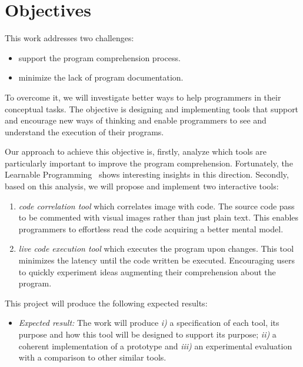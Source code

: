
% 
% 

\section{Objectives}

This work addresses two challenges:

\begin{itemize}
\item support the program comprehension process.
\item minimize the lack of program documentation.
\end{itemize}

To overcome it, we will investigate better ways to help programmers in their conceptual tasks. The objective is designing and implementing tools that support and encourage new ways of thinking and enable programmers to see and understand the execution of their programs.

Our approach to achieve this objective is, firstly, analyze which tools are particularly important to improve the program comprehension. Fortunately, the Learnable Programming~\cite{learnableProg,inventingPrin} shows interesting insights in this direction. Secondly, based on this analysis, we will propose and implement two interactive tools: 

\begin{enumerate}
\item \textit{code correlation tool} which correlates image with code. The source code pass to be commented with visual images rather than just plain text. This enables programmers to effortless read the code acquiring a better mental model.
\item \textit{live code execution tool} which executes the program upon changes. This tool minimizes the latency until the code written be executed. Encouraging users to quickly experiment ideas augmenting their comprehension about the program.
\end{enumerate}

This project will produce the following expected results:
 
\begin{itemize}
\item[] \textit{Expected result:} The work will produce \textit{i)} a specification of each tool, its purpose and how this tool will be designed to support its purpose; \textit{ii)} a coherent implementation of a prototype and \textit{iii)} an experimental evaluation with a comparison to other similar tools.
\end{itemize}
